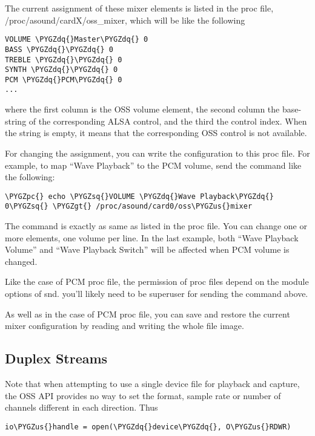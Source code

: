 \documentclass[a4paper,8pt,english]{sphinxmanual}
\def\PYGZus{\char`\_}
\def\PYGZgt{\char`\>}
\def\PYGZpc{\char`\%}
\def\PYGZsq{\char`\'}
\def\PYGZdq{\char`\"}
\renewcommand\PYGZsq{\textquotesingle}
\begin{document}
The current assignment of these mixer elements is listed in the proc
file, /proc/asound/cardX/oss\_mixer, which will be like the following

\begin{Verbatim}[commandchars=\\\{\}]
VOLUME \PYGZdq{}Master\PYGZdq{} 0
BASS \PYGZdq{}\PYGZdq{} 0
TREBLE \PYGZdq{}\PYGZdq{} 0
SYNTH \PYGZdq{}\PYGZdq{} 0
PCM \PYGZdq{}PCM\PYGZdq{} 0
...
\end{Verbatim}

where the first column is the OSS volume element, the second column
the base-string of the corresponding ALSA control, and the third the
control index.  When the string is empty, it means that the
corresponding OSS control is not available.

For changing the assignment, you can write the configuration to this
proc file.  For example, to map ``Wave Playback'' to the PCM volume,
send the command like the following:

\begin{Verbatim}[commandchars=\\\{\}]
\PYGZpc{} echo \PYGZsq{}VOLUME \PYGZdq{}Wave Playback\PYGZdq{} 0\PYGZsq{} \PYGZgt{} /proc/asound/card0/oss\PYGZus{}mixer
\end{Verbatim}

The command is exactly as same as listed in the proc file.  You can
change one or more elements, one volume per line.  In the last
example, both ``Wave Playback Volume'' and ``Wave Playback Switch'' will
be affected when PCM volume is changed.

Like the case of PCM proc file, the permission of proc files depend on
the module options of snd.  you'll likely need to be superuser for
sending the command above.

As well as in the case of PCM proc file, you can save and restore the
current mixer configuration by reading and writing the whole file
image.


\subsection{Duplex Streams}
\label{sound/designs/oss-emulation:duplex-streams}
Note that when attempting to use a single device file for playback and
capture, the OSS API provides no way to set the format, sample rate or
number of channels different in each direction.  Thus

\begin{Verbatim}[commandchars=\\\{\}]
io\PYGZus{}handle = open(\PYGZdq{}device\PYGZdq{}, O\PYGZus{}RDWR)
\end{Verbatim}
\end{document}

